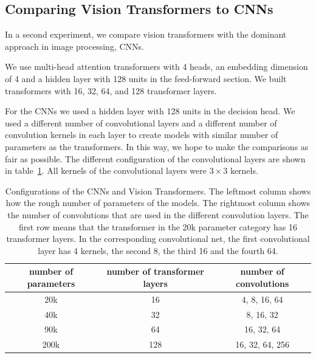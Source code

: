 \documentclass[a4paper]{scrartcl}
\begin{document}
    \subsection{Comparing Vision Transformers to CNNs}\label{subsec:comparing-vision-transformers-to-cnns}
    In a second experiment, we compare vision transformers with the dominant approach in image processing, CNNs.

    We use multi-head attention transformers with 4 heads, an embedding dimension of 4 and a hidden layer with 128 units in the feed-forward section.
    We built transformers with 16, 32, 64, and 128 transformer layers.

    For the CNNs we used a hidden layer with 128 units in the decision head.
    We used a different number of convolutional layers and a different number of convolution kernels in each layer to create models with similar number of parameters as the transformers.
    In this way, we hope to make the comparisons as fair as possible.
    The different configuration of the convolutional layers are shown in table~\ref{tab:cnn-configurations}.
    All kernels of the convolutional layers were $3 \times 3$ kernels.


    \begin{table}[ht]
        \centering
        \begin{tabular}{ | c | c | c | }
            \hline
            number of parameters & number of transformer layers & number of convolutions \\
            \hline
            20k                  & 16                           & 4, 8, 16, 64           \\
            40k                  & 32                           & 8, 16, 32              \\
            90k                  & 64                           & 16, 32, 64             \\
            200k                 & 128                          & 16, 32, 64, 256        \\
            \hline
        \end{tabular}
        \caption[Configurations of the CNNs and Vision Transformers ]{
            Configurations of the CNNs and Vision Transformers.
            The leftmost column shows how the rough number of parameters of the models.
            The rightmost column shows the number of convolutions that are used in the different convolution layers.
            The first row means that the transformer in the 20k parameter category has 16 transformer layers.
            In the corresponding convolutional net, the first convolutional layer has 4 kernels, the second 8, the third 16 and the fourth 64.
        }\label{tab:cnn-configurations}
    \end{table}
\end{document}
